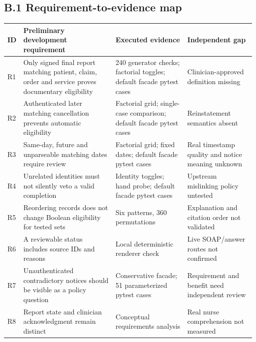 \documentclass[11pt,twocolumn]{article}
\begin{document}
\subsection*{B.1 Requirement-to-evidence map}
\begin{strip}
\centering\scriptsize\setlength{\tabcolsep}{3pt}
\label{tab:trace}
\begin{tabular}{@{}p{}p{}p{}p{}@{}}\toprule
ID & Preliminary development requirement & Executed evidence & Independent gap \\\midrule
R1 & Only signed final report matching patient, claim, order and service proves documentary eligibility & 240 generator checks; factorial toggles; default facade pytest cases & Clinician-approved definition missing \\
R2 & Authenticated later matching cancellation prevents automatic eligibility & Factorial grid; single-case comparison; default facade pytest cases & Reinstatement semantics absent \\
R3 & Same-day, future and unparseable matching dates require review & Factorial grid; fixed dates; default facade pytest cases & Real timestamp quality and notice meaning unknown \\
R4 & Unrelated identities must not silently veto a valid completion & Identity toggles; hand probe; default facade pytest cases & Upstream mislinking policy untested \\
R5 & Reordering records does not change Boolean eligibility for tested sets & Six patterns, 360 permutations & Explanation and citation order not validated \\
R6 & A reviewable status includes source IDs and reasons & Local deterministic renderer check & Live SOAP/answer routes not confirmed \\
R7 & Unauthenticated contradictory notices should be visible as a policy question & Conservative facade; 51 parameterized pytest cases & Requirement and benefit need independent review \\
R8 & Report state and clinician acknowledgment remain distinct & Conceptual requirements analysis & Real nurse comprehension not measured \\\bottomrule
\end{tabular}
\end{strip}
\clearpage
\linespread{1.05}\selectfont
\end{document}
